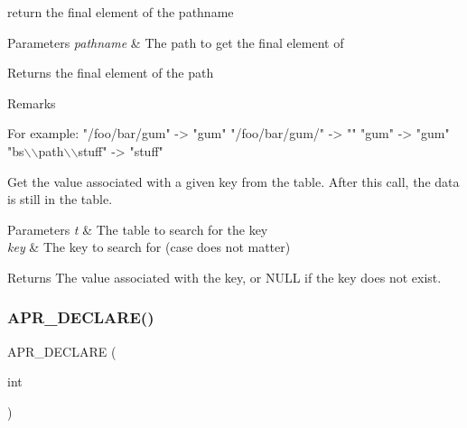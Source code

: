 return the final element of the pathname 
\begin{DoxyParams}{Parameters}
{\em pathname} & The path to get the final element of \\
\hline
\end{DoxyParams}
\begin{DoxyReturn}{Returns}
the final element of the path 
\end{DoxyReturn}
\begin{DoxyRemark}{Remarks}

\begin{DoxyPre}
For example:
                "/foo/bar/gum"    -> "gum"
                "/foo/bar/gum/"   -> ""
                "gum"             -> "gum"
                "bs\(\backslash\)\(\backslash\)path\(\backslash\)\(\backslash\)stuff" -> "stuff"
\end{DoxyPre}

\end{DoxyRemark}
Get the value associated with a given key from the table. After this call, the data is still in the table. 
\begin{DoxyParams}{Parameters}
{\em t} & The table to search for the key \\
\hline
{\em key} & The key to search for (case does not matter) \\
\hline
\end{DoxyParams}
\begin{DoxyReturn}{Returns}
The value associated with the key, or N\+U\+LL if the key does not exist. 
\end{DoxyReturn}
\mbox{\label{group__apr__lib_gabfb3aa49508166a7d0cc70945b0164b7}} 
\subsubsection{\texorpdfstring{A\+P\+R\+\_\+\+D\+E\+C\+L\+A\+R\+E()}{APR\_DECLARE()}\hspace{0.1cm}{\footnotesize\ttfamily [2/2]}}
{\footnotesize\ttfamily A\+P\+R\+\_\+\+D\+E\+C\+L\+A\+RE (\begin{DoxyParamCaption}\item[{int}]{ }\end{DoxyParamCaption})}

